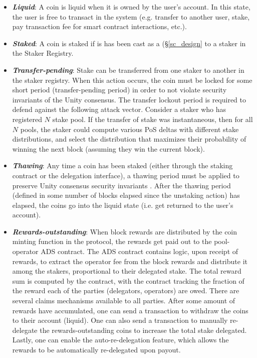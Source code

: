 \begin{itemize}
    \item \textbf{\textit{Liquid}}: A coin is liquid when it is owned by the user's account. In this state, the user is free to transact in the system (e.g. transfer to another user, stake, pay transaction fee for smart contract interactions, etc.).
    \item \textbf{\textit{Staked}}: A coin is staked if is has been cast as a  (\S\ref{sc_design} to a staker in the Staker Registry. 
    \item \textbf{\textit{Transfer-pending}}: Stake can be transferred from one staker to another in the staker registry. When this action occurs, the coin must be locked for some short period (transfer-pending period) in order to not violate security invariants of the Unity consensus. The transfer lockout period is required to defend against the following attack vector. Consider a staker who has registered $N$ stake pool. If the transfer of stake was instantaneous, then for all $N$ pools, the staker could compute various PoS  deltas with different stake distributions, and select the distribution that maximizes their probability of winning the next block (assuming they win the current block).  
    \item \textbf{\textit{Thawing}}: Any time a coin has been staked (either through the staking contract or the delegation interface), a thawing period must be applied to preserve Unity consensus security invariants \cite{WZS19}. After the thawing period (defined in some number of blocks elapsed since the unstaking action) has elapsed, the coins go into the liquid state (i.e. get returned to the user's account). 
    \item \textbf{\textit{Rewards-outstanding}}: When block rewards are distributed by the coin minting function in the protocol, the rewards get paid out to the pool-operator ADS contract. The ADS contract contains logic, upon receipt of rewards, to extract the operator fee from the block rewards and distribute it among the stakers, proportional to their delegated stake. The total reward sum is computed by the contract, with the contract tracking the fraction of the reward each of the parties (delegators, operators) are owed. There are several claims mechanisms available to all parties. After some amount of rewards have accumulated, one can send a transaction to withdraw the coins to their account (liquid). One can also send a transaction to manually re-delegate the rewards-outstanding coins to increase the total stake delegated. Lastly, one can enable the auto-re-delegation feature, which allows the rewards to be automatically re-delegated upon payout. 
\end{itemize}

